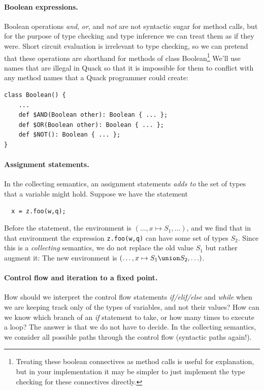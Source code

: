 \documentclass[11pt]{article}
\begin{document}
\paragraph{Boolean expressions.}
Boolean operations \emph{and}, \emph{or}, and \emph{not} are not
syntactic sugar for method calls, but for the purpose of type checking
and type inference we can treat them as if they were.  Short circuit
evaluation is irrelevant to type checking, so we can pretend that
these operations are shorthand for methods of class
Boolean\footnote{Treating these boolean connectives as method calls is
  useful for explanation, but in your implementation it may be simpler
  to just implement the type checking for these connectives directly.}
We'll
use names that are illegal in Quack so that it is impossible for them
to conflict with any method names that a Quack programmer could
create: 

\begin{verbatim}
class Boolean() {
    ...
    def $AND(Boolean other): Boolean { ... }; 
    def $OR(Boolean other): Boolean { ... }; 
    def $NOT(): Boolean { ... }; 
}
\end{verbatim}


\paragraph{Assignment statements.}

In the collecting semantics, an assignment statements \emph{adds to}
the set of types that a variable might hold.  Suppose we have the 
statement 
\begin{verbatim}
  x = z.foo(w,q);
\end{verbatim}

Before the statement, the environment is \( ( \ldots , x \mapsto S_1,
\ldots ) \), and we find that in that environment the expression
\verb|z.foo(w,q)| can have some set of types $S_2$.  Since this is a
\emph{collecting} semantics, we do not replace the old value $S_1$ but
rather augment it:  The new environment is 
\( ( \ldots ,  x \mapsto S_1 \union S_2 , \ldots )\). 

\paragraph{Control flow and iteration to a fixed point.}

How should we interpret the control flow statements
\emph{if/elif/else} and \emph{while} when we are keeping track only of
the types of variables, and not their values?   How can we know which
branch of an \emph{if} statement to take, or how many times to execute
a loop?  The answer is that we do not have to decide.  In the
collecting semantics, we consider all possible paths through the
control flow (syntactic paths again!).   
\end{document}
